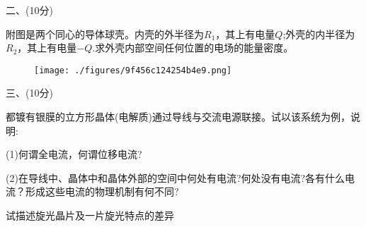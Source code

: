 二、(10分)

附图是两个同心的导体球壳。内壳的外半径为$R_1$，其上有电量$Q$;外壳的内半径为$R_2$，其上有电量$-Q$.求外壳内部空间任何位置的电场的能量密度。
\begin{figure}[ht]
\centering
\texttt{[image: ./figures/9f456c124254b4e9.png]}
\caption{} \label{fig_PKU199_4}
\end{figure}

三、(10分)

都镀有银膜的立方形晶体(电解质)通过导线与交流电源联接。试以该系统为例，说明:

(1)何谓全电流，何谓位移电流?

(2)在导线中、晶体中和晶体外部的空间中何处有电流?何处没有电流?各有什么电流？形成这些电流的物理机制有何不同?

试描述旋光晶片及一片旋光特点的差异